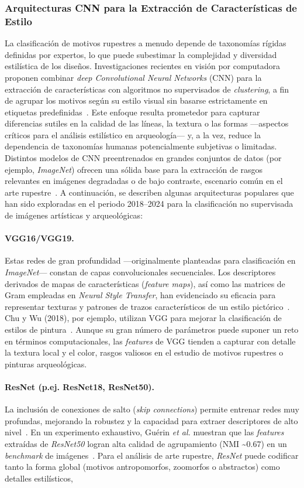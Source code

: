 \subsubsection{Arquitecturas CNN para la Extracción de Características de Estilo } La clasificación de motivos rupestres a menudo depende de taxonomías rígidas definidas por expertos, lo que puede subestimar la complejidad y diversidad estilística de los diseños. Investigaciones recientes en visión por computadora proponen combinar \textit{deep Convolutional Neural Networks} (CNN) para la extracción de características con algoritmos no supervisados de \textit{clustering}, a fin de agrupar los motivos según su estilo visual sin basarse estrictamente en etiquetas predefinidas~\cite{gairola2020}. Este enfoque resulta prometedor para capturar diferencias sutiles en la calidad de las líneas, la textura o las formas —aspectos críticos para el análisis estilístico en arqueología— y, a la vez, reduce la dependencia de taxonomías humanas potencialmente subjetivas o limitadas. Distintos modelos de CNN preentrenados en grandes conjuntos de datos (por ejemplo, \textit{ImageNet}) ofrecen una sólida base para la extracción de rasgos relevantes en imágenes degradadas o de bajo contraste, escenario común en el arte rupestre~\cite{guerin2018}. A continuación, se describen algunas arquitecturas populares que han sido exploradas en el periodo 2018–2024 para la clasificación no supervisada de imágenes artísticas y arqueológicas: \paragraph{VGG16/VGG19.} Estas redes de gran profundidad —originalmente planteadas para clasificación en \textit{ImageNet}— constan de capas convolucionales secuenciales. Los descriptores derivados de mapas de características (\textit{feature maps}), así como las matrices de Gram empleadas en \textit{Neural Style Transfer}, han evidenciado su eficacia para representar texturas y patrones de trazos característicos de un estilo pictórico~\cite{gairola2020}. Chu y Wu (2018), por ejemplo, utilizan VGG para mejorar la clasificación de estilos de pintura~\cite{gairola2020}. Aunque su gran número de parámetros puede suponer un reto en términos computacionales, las \textit{features} de VGG tienden a capturar con detalle la textura local y el color, rasgos valiosos en el estudio de motivos rupestres o pinturas arqueológicas. \paragraph{ResNet (p.ej. ResNet18, ResNet50).} La inclusión de conexiones de salto (\textit{skip connections}) permite entrenar redes muy profundas, mejorando la robustez y la capacidad para extraer descriptores de alto nivel~\cite{guerin2018}. En un experimento exhaustivo, Guérin \textit{et al.} muestran que las \textit{features} extraídas de \textit{ResNet50} logran alta calidad de agrupamiento (NMI \textasciitilde 0.67) en un \textit{benchmark} de imágenes~\cite{guerin2018}. Para el análisis de arte rupestre, \textit{ResNet} puede codificar tanto la forma global (motivos antropomorfos, zoomorfos o abstractos) como detalles estilísticos, 